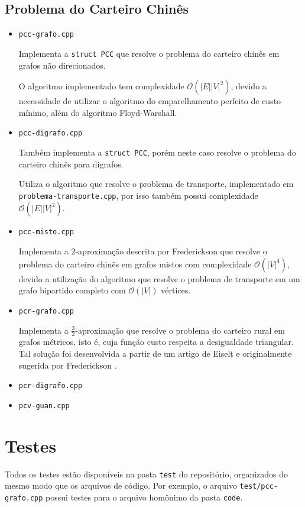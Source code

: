 \subsection{Problema do Carteiro Chinês}
\begin{itemize}
    \item \texttt{pcc-grafo.cpp}

        Implementa a \texttt{struct PCC} que resolve o problema do carteiro chinês em grafos não direcionados. 

        O algoritmo implementado tem complexidade $\mathcal{O}(|E||V|^2)$, devido a necessidade de utilizar o algoritmo do emparelhamento perfeito de custo mínimo, além do algoritmo Floyd-Warshall.
    \item \texttt{pcc-digrafo.cpp}

        Também implementa a \texttt{struct PCC}, porém neste caso resolve o problema do carteiro chinês para digrafos.

        Utiliza o algoritmo que resolve o problema de transporte, implementado em \texttt{problema-transporte.cpp}, por isso também possui complexidade $\mathcal{O}(|E||V|^2)$.
    \item \texttt{pcc-misto.cpp}

        Implementa a $2$-aproximação descrita por Frederickson \cite{frederickson} que resolve o problema do carteiro chinês em grafos mistos com complexidade $\mathcal{O}(|V|^4)$, devido a utilização do algoritmo que resolve o problema de transporte em um grafo bipartido completo com $\mathcal{O}(|V|)$ vértices.

    \item \texttt{pcr-grafo.cpp}
        
        Implementa a $\frac{3}{2}$-aproximação que resolve o problema do carteiro rural em grafos métricos, isto é, cuja função custo respeita a desigualdade triangular.  
        Tal solução foi desenvolvida a partir de um artigo de Eiselt \cite{michel} e originalmente sugerida por Frederickson \cite{frederickson}.
        
    \item \texttt{pcr-digrafo.cpp}
    \item \texttt{pcv-guan.cpp}
\end{itemize}

\section{Testes}

Todos os testes estão disponíveis na pasta \texttt{test} do repositório, organizados do mesmo modo que os arquivos de código.
Por exemplo, o arquivo \texttt{test/pcc-grafo.cpp} possui testes para o arquivo homônimo da pasta \texttt{code}.


